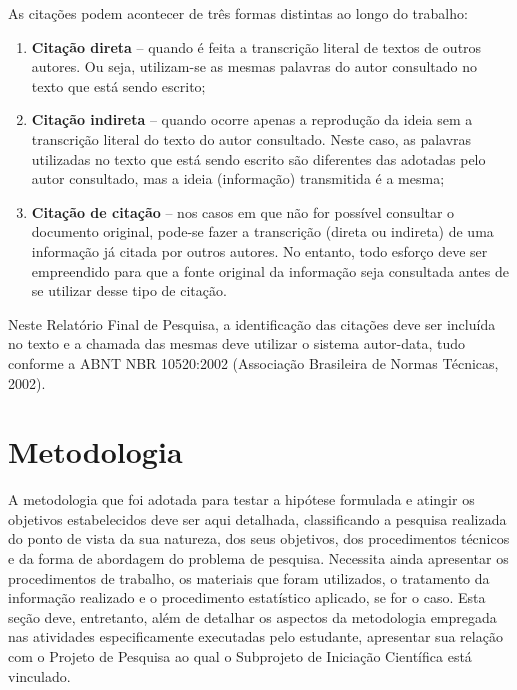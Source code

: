 \documentclass[10pt,a4paper]{article}
\begin{document}
\vspace{\baselineskip}
As citações podem acontecer de três formas distintas ao longo do trabalho:
\begin{enumerate}
  \item \textbf{Citação direta} -- quando é feita a transcrição literal de textos de outros autores. Ou seja, utilizam-se as mesmas palavras do autor consultado no texto que está sendo escrito;
  \item \textbf{Citação indireta} -- quando ocorre apenas a reprodução da ideia sem a transcrição literal do texto do autor consultado. Neste caso, as palavras utilizadas no texto que está sendo escrito são diferentes das adotadas pelo autor consultado, mas a ideia (informação) transmitida é a mesma;
  \item \textbf{Citação de citação} -- nos casos em que não for possível consultar o documento original, pode-se fazer a transcrição (direta ou indireta) de uma informação já citada por outros autores. No entanto, todo esforço deve ser empreendido para que a fonte original da informação seja consultada antes de se utilizar desse tipo de citação.
\end{enumerate}

\vspace{\baselineskip}
Neste Relatório Final de Pesquisa, a identificação das citações deve ser incluída no texto e a chamada das mesmas deve utilizar o sistema autor-data, tudo conforme a ABNT NBR 10520:2002 (Associação Brasileira de Normas Técnicas, 2002).

\section{Metodologia}
A metodologia que foi adotada para testar a hipótese formulada e atingir os objetivos estabelecidos deve ser aqui detalhada, classificando a pesquisa realizada do ponto de vista da sua natureza, dos seus objetivos, dos procedimentos técnicos e da forma de abordagem do problema de pesquisa. Necessita ainda apresentar os procedimentos de trabalho, os materiais que foram utilizados, o tratamento da informação realizado e o procedimento estatístico aplicado, se for o caso. Esta seção deve, entretanto, além de detalhar os aspectos da metodologia empregada nas atividades especificamente executadas pelo estudante, apresentar sua relação com o Projeto de Pesquisa ao qual o Subprojeto de Iniciação Científica está vinculado.
\end{document}
